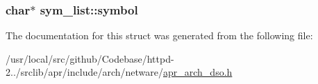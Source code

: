 \subsubsection[{\texorpdfstring{symbol}{symbol}}]{\setlength{\rightskip}{0pt plus 5cm}char$\ast$ sym\+\_\+list\+::symbol}\hypertarget{structsym__list_a1f3e4b6c851ab374a8d527c95abefdf0}{}\label{structsym__list_a1f3e4b6c851ab374a8d527c95abefdf0}


The documentation for this struct was generated from the following file\+:\begin{DoxyCompactItemize}
\item 
/usr/local/src/github/\+Codebase/httpd-\/2../srclib/apr/include/arch/netware/\hyperlink{netware_2apr__arch__dso_8h}{apr\+\_\+arch\+\_\+dso.\+h}\end{DoxyCompactItemize}
